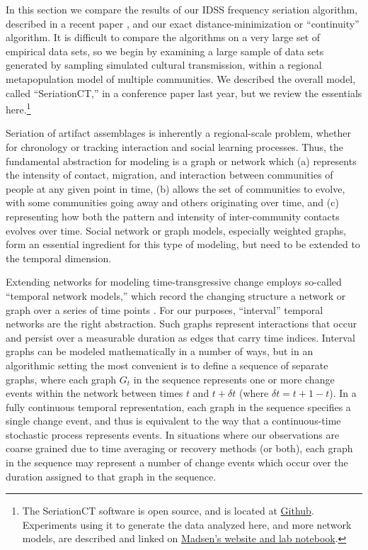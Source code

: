 \documentclass[graybox,natbib]{svmult}
\begin{document}
In this section we compare the results of our IDSS frequency seriation
algorithm, described in a recent paper \citep{lipomadsendunnell2015},
and our exact distance-minimization or ``continuity'' algorithm. It is
difficult to compare the algorithms on a very large set of empirical
data sets, so we begin by examining a large sample of data sets
generated by sampling simulated cultural transmission, within a regional
metapopulation model of multiple communities. We described the overall
model, called ``SeriationCT,'' in a conference paper last year, but we
review the essentials here.\footnote{The SeriationCT software is open
  source, and is located at
  \href{https://github.com/mmadsen/seriationct}{Github}. Experiments
  using it to generate the data analyzed here, and more network models,
  are described and linked on
  \href{http://notebook.madsenlab.org}{Madsen's website and lab
  notebook}.}

Seriation of artifact assemblages is inherently a regional-scale
problem, whether for chronology or tracking interaction and social
learning processes. Thus, the fundamental abstraction for modeling is a
graph or network which (a) represents the intensity of contact,
migration, and interaction between communities of people at any given
point in time, (b) allows the set of communities to evolve, with some
communities going away and others originating over time, and (c)
representing how both the pattern and intensity of inter-community
contacts evolves over time. Social network or graph models, especially
weighted graphs, form an essential ingredient for this type of modeling,
but need to be extended to the temporal dimension.

Extending networks for modeling time-transgressive change employs
so-called ``temporal network models,'' which record the changing
structure a network or graph over a series of time points
\citep{Holme2012}. For our purposes, ``interval'' temporal networks are
the right abstraction. Such graphs represent interactions that occur and
persist over a measurable duration as edges that carry time indices.
Interval graphs can be modeled mathematically in a number of ways, but
in an algorithmic setting the most convenient is to define a sequence of
separate graphs, where each graph \(G_t\) in the sequence represents one
or more change events within the network between times \(t\) and
\(t + \delta t\) (where \(\delta t = t+1 - t\)). In a fully continuous
temporal representation, each graph in the sequence specifies a single
change event, and thus is equivalent to the way that a continuous-time
stochastic process represents events. In situations where our
observations are coarse grained due to time averaging or recovery
methods (or both), each graph in the sequence may represent a number of
change events which occur over the duration assigned to that graph in
the sequence.
\end{document}
